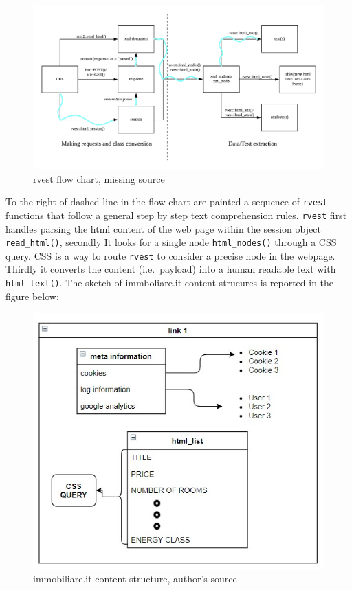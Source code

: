 \documentclass[
  12pt,
  a4paper,
  oneside]{book}
\begin{document}
\begin{figure}
\hypertarget{fig:workflow}{%
\centering
\includegraphics{images/workflow.png}
\caption{rvest flow chart, missing source}\label{fig:workflow}
}
\end{figure}

To the right of dashed line in the flow chart are painted a sequence of \texttt{rvest}\citep{rvest} functions that follow a general step by step text comprehension rules. \texttt{rvest} first handles parsing the html content of the web page within the session object \texttt{read\_html()}, secondly It looks for a single node \texttt{html\_nodes()} through a CSS query. CSS is a way to route \texttt{rvest} to consider a precise node in the webpage. Thirdly it converts the content (i.e.~payload) into a human readable text with \texttt{html\_text()}. The sketch of immboliare.it content strucures is reported in the figure below:

\begin{figure}
\centering
\includegraphics{images/content_structure.jpg}
\caption{immobiliare.it content structure, author's source}
\end{figure}
\end{document}
